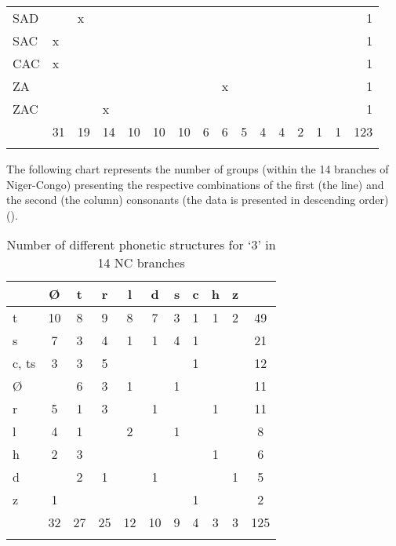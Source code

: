 \begin{table}
\begin{tabularx}{\textwidth}{lXXXXXXXXXXXXXXr}
{SAD} &  & {x} &  &  &  &  &  &  &  &  &  &  &  &  & {1}\\
{SAC} & {x} &  &  &  &  &  &  &  &  &  &  &  &  &  & {1}\\
{CAC} & {x} &  &  &  &  &  &  &  &  &  &  &  &  &  & {1}\\
{ZA} &  &  &  &  &  &  &  & {x} &  &  &  &  &  &  & {1}\\
{ZAC} &  &  & {x} &  &  &  &  &  &  &  &  &  &  &  & {1}\\
\midrule
& {{31}} & {{19}} & {{14}} & {{10}} & {{10}} & {{10}} & {{6}} & {{6}} & {{5}} & {{4}} & {{4}} & {{2}} & {{1}} & {{1}} & {{123}}\\
\lspbottomrule
\end{tabularx}
\end{table}

The following chart represents the number of groups (within the 14 branches of Niger-Congo) presenting the respective combinations of the first (the line) and the second (the column) consonants (the data is presented in descending order) ().

\begin{table}
\caption{\label{tab:4:12}Number of different phonetic structures for `3' in 14 NC branches} 


\begin{tabularx}{.8\textwidth}{lSSSSSSSSSS}
\lsptoprule

~ & Ø & t & r & l & d & s & c & h & z & {~}\\
\midrule 
t & 10 & 8 & 9 & 8 & 7 & 3 & 1 & 1 & 2 & {49}\\
s & 7 & 3 & 4 & 1 & 1 & 4 & 1 & ~ & ~ & {21}\\
c, ts & 3 & 3 & 5 & ~ & ~ & ~ & 1 & ~ & ~ & {12}\\
Ø & ~ & 6 & 3 & 1 & ~ & 1 & ~ & ~ & ~ & {11}\\
r & 5 & 1 & 3 & ~ & 1 & ~ & ~ & 1 & ~ & {11}\\
l & 4 & 1 & ~ & 2 & ~ & 1 & ~ & ~ & ~ & {8}\\
h & 2 & 3 & ~ & ~ & ~ & ~ & ~ & 1 & ~ & {6}\\
d & ~ & 2 & 1 & ~ & 1 & ~ & ~ & ~ & 1 & {5}\\
z & 1 & ~ & ~ & ~ & ~ & ~ & 1 & ~ & ~ & {2}\\
\midrule
~ & {32} & {27} & {25} & {12} & {10} & {9} & {4} & {3} & {3} & {125}\\
\lspbottomrule
\end{tabularx}
\end{table}

